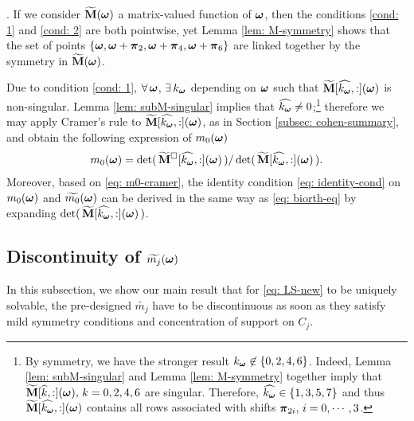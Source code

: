 .
If we consider $\widetilde{\mathbf{M}}(\boldsymbol{\omega})$ a matrix-valued function of $\boldsymbol{\omega}$, then the conditions \ref{cond: 1} and \ref{cond: 2} are both pointwise, yet Lemma \ref{lem: M-symmetry} shows that the set of points $\{\boldsymbol{\omega},\boldsymbol{\omega}+\boldsymbol{\pi}_2,\boldsymbol{\omega} + \boldsymbol{\pi}_4, \boldsymbol{\omega}+\boldsymbol{\pi}_6\}$ are linked together by the symmetry in $\widetilde{\mathbf{M}}(\boldsymbol{\omega})$. 

Due to condition \ref{cond: 1}, $\forall\,\boldsymbol{\omega}$, $\exists\, k_{\boldsymbol{\omega}}$ depending on $\boldsymbol{\omega}$ such that $\widetilde{\mathbf{M}}[\widehat{k_{\boldsymbol{\omega}}},:](\boldsymbol{\omega})$ is non-singular. Lemma \ref{lem: subM-singular} implies that $\widehat{k_{\boldsymbol{\omega}}}\neq 0$;\footnote{By symmetry, we have the stronger result $k_{\boldsymbol{\omega}}\not\in\{0,2,4,6\}$. Indeed, Lemma \ref{lem: subM-singular} and Lemma \ref{lem: M-symmetry} together imply that $\widetilde{\mathbf{M}}[\widehat{k},:](\boldsymbol{\omega}),\,k=0,2,4,6$ are singular. Therefore, $\widehat{k_{\boldsymbol{\omega}}} \in\{1,3,5,7\}$ and thus $\widetilde{\mathbf{M}}[\widehat{k_{\boldsymbol{\omega}}},:](\boldsymbol{\omega})$ contains all rows associated with shifts $\boldsymbol{\pi}_{2i},\, i = 0,\cdots,3$. 
} 
therefore we may apply Cramer's rule to $\widetilde{\mathbf{M}}[\widehat{k_{\boldsymbol{\omega}}},:](\boldsymbol{\omega})$, as in Section \ref{subsec: cohen-summary}, and obtain
the following expression of $m_0(\boldsymbol{\omega})$
\begin{align}\label{eq: m0-cramer}
m_0(\boldsymbol{\omega}) = \det(\,\widetilde{\mathbf{M}}^{\Box}[\widehat{k_{\boldsymbol{\omega}}},:](\boldsymbol{\omega})\,)/\det(\,\widetilde{\mathbf{M}}[\widehat{k_{\boldsymbol{\omega}}},:](\boldsymbol{\omega})\,).
\end{align}
Moreover, based on \eqref{eq: m0-cramer}, the identity condition \eqref{eq: identity-cond} on $m_0(\boldsymbol{\omega})$ and $\widetilde{m_{0}}(\boldsymbol{\omega})$ can be derived in the same way as \eqref{eq: biorth-eq} by expanding $\det(\,\widetilde{\mathbf{M}}[\widehat{k_{\boldsymbol{\omega}}},:](\boldsymbol{\omega})\,)$.


\subsection{Discontinuity of $\widetilde{m_{j}}(\boldsymbol{\omega})$}\label{subsec: discontinuity}
In this subsection, we show our main result that for \eqref{eq: LS-new} to be uniquely solvable, the pre-designed $\widetilde{m_j}$ have to be discontinuous as soon as they satisfy mild symmetry conditions and concentration of support on $C_j$.

